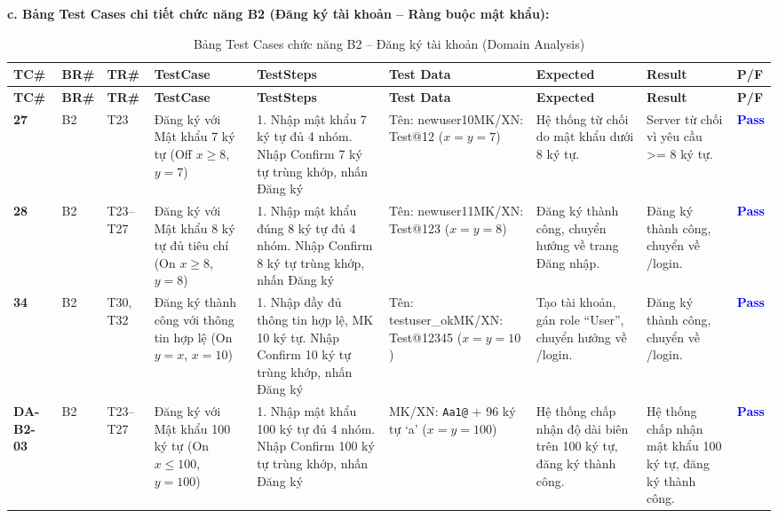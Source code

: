 \documentclass[11pt,a4paper]{article}
\begin{document}
\noindent\textbf{c. Bảng Test Cases chi tiết chức năng B2 (Đăng ký tài khoản -- Ràng buộc mật khẩu):}
\begingroup
\scriptsize
\setlength{\tabcolsep}{3pt}
\begin{longtable}{|C{0.95cm}|C{0.75cm}|C{0.95cm}|L{2.0cm}|L{2.95cm}|L{2.15cm}|L{2.6cm}|L{2.45cm}|C{0.85cm}|}
\hline
{}
\textbf{TC\#} & \textbf{BR\#} & \textbf{TR\#} & \textbf{TestCase} & \textbf{TestSteps} & \textbf{Test Data} & \textbf{Expected} & \textbf{Result} & \textbf{P/F} \tabularnewline
\hline
\endfirsthead
\hline
{}
\textbf{TC\#} & \textbf{BR\#} & \textbf{TR\#} & \textbf{TestCase} & \textbf{TestSteps} & \textbf{Test Data} & \textbf{Expected} & \textbf{Result} & \textbf{P/F} \tabularnewline
\hline
\endhead
\hline
\endfoot
\hline
\caption{Bảng Test Cases chức năng B2 -- Đăng ký tài khoản (Domain Analysis)}
\endlastfoot
\textbf{27} & B2 & T23 & Đăng ký với Mật khẩu 7 ký tự (Off $x \ge 8$, $y = 7$) & 1. Nhập mật khẩu 7 ký tự đủ 4 nhóm. Nhập Confirm 7 ký tự trùng khớp, nhấn Đăng ký & Tên: newuser10\newline MK/XN: Test@12 ($x=y=7$) & Hệ thống từ chối do mật khẩu dưới 8 ký tự. & Server từ chối vì yêu cầu >= 8 ký tự. & \textcolor{blue}{\textbf{Pass}} \\ \hline
\textbf{28} & B2 & T23--T27 & Đăng ký với Mật khẩu 8 ký tự đủ tiêu chí (On $x \ge 8$, $y = 8$) & 1. Nhập mật khẩu đúng 8 ký tự đủ 4 nhóm. Nhập Confirm 8 ký tự trùng khớp, nhấn Đăng ký & Tên: newuser11\newline MK/XN: Test@123 ($x=y=8$) & Đăng ký thành công, chuyển hướng về trang Đăng nhập. & Đăng ký thành công, chuyển về /login. & \textcolor{blue}{\textbf{Pass}} \\ \hline
\textbf{34} & B2 & T30, T32 & Đăng ký thành công với thông tin hợp lệ (On $y = x$, $x = 10$) & 1. Nhập đầy đủ thông tin hợp lệ, MK 10 ký tự. Nhập Confirm 10 ký tự trùng khớp, nhấn Đăng ký & Tên: testuser\_ok\newline MK/XN: Test@12345 ($x=y=10$) & Tạo tài khoản, gán role ``User'', chuyển hướng về /login. & Đăng ký thành công, chuyển về /login. & \textcolor{blue}{\textbf{Pass}} \\ \hline
\textbf{DA-B2-03} & B2 & T23--T27 & Đăng ký với Mật khẩu 100 ký tự (On $x \le 100$, $y = 100$) & 1. Nhập mật khẩu 100 ký tự đủ 4 nhóm. Nhập Confirm 100 ký tự trùng khớp, nhấn Đăng ký & MK/XN: \texttt{Aa1@} + 96 ký tự `a' ($x=y=100$) & Hệ thống chấp nhận độ dài biên trên 100 ký tự, đăng ký thành công. & Hệ thống chấp nhận mật khẩu 100 ký tự, đăng ký thành công. & \textcolor{blue}{\textbf{Pass}} \\ \hline

\end{longtable}
\end{document}
